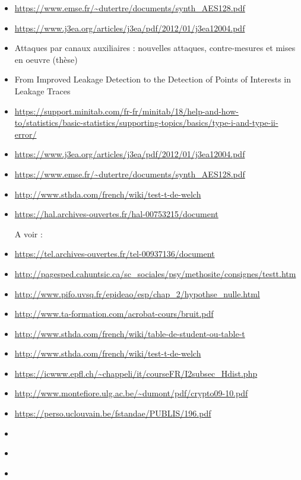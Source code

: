 \documentclass[10pt, oneside, a4paper]{article}
\begin{document}
\begin{itemize}
\item \url{https://www.emse.fr/~dutertre/documents/synth_AES128.pdf}
\item \url{https://www.j3ea.org/articles/j3ea/pdf/2012/01/j3ea12004.pdf}
\item Attaques par canaux auxiliaires : nouvelles attaques, contre-mesures et mises en oeuvre (thèse)
\item From Improved Leakage Detection to the Detection of Points of Interests in Leakage Traces
\item \url{https://support.minitab.com/fr-fr/minitab/18/help-and-how-to/statistics/basic-statistics/supporting-topics/basics/type-i-and-type-ii-error/}
\item \url{https://www.j3ea.org/articles/j3ea/pdf/2012/01/j3ea12004.pdf}
\item \url{https://www.emse.fr/~dutertre/documents/synth_AES128.pdf}
\item \url{http://www.sthda.com/french/wiki/test-t-de-welch}
\item \url{https://hal.archives-ouvertes.fr/hal-00753215/document}

A voir :
\item \url{https://tel.archives-ouvertes.fr/tel-00937136/document}
\item \url{http://pagesped.cahuntsic.ca/sc_sociales/psy/methosite/consignes/testt.htm}
\item \url{http://www.pifo.uvsq.fr/epideao/esp/chap_2/hypothse_nulle.html}
\item \url{http://www.ta-formation.com/acrobat-cours/bruit.pdf}
\item \url{http://www.sthda.com/french/wiki/table-de-student-ou-table-t}
\item \url{http://www.sthda.com/french/wiki/test-t-de-welch}
\item \url{https://icwww.epfl.ch/~chappeli/it/courseFR/I2subsec_Hdist.php}
\item \url{http://www.montefiore.ulg.ac.be/~dumont/pdf/crypto09-10.pdf}
\item \url{https://perso.uclouvain.be/fstandae/PUBLIS/196.pdf}
\item \url{}
\item \url{}
\item \url{}
\end{itemize}


\appendix
\clearpage
\end{document}

